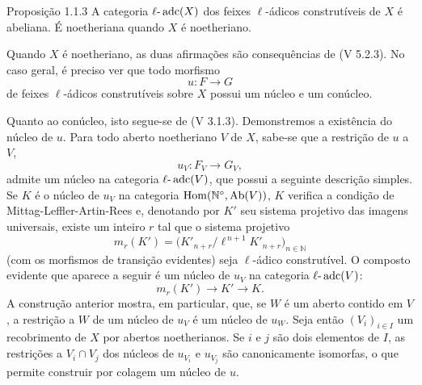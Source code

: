 \begin{statement}{Proposição 1.1.3}
A categoria \(\ell\text{-}\operatorname{adc}(X)\) dos feixes \(\ell\)-ádicos construtíveis de \(X\) é abeliana. É noetheriana quando \(X\) é noetheriano.
\end{statement}

\begin{prooftext}[Demonstração]
Quando \(X\) é noetheriano, as duas afirmações são consequências de (V 5.2.3). No caso geral, é preciso ver que todo morfismo
\[
u:F\longrightarrow G
\]
de feixes \(\ell\)-ádicos construtíveis sobre \(X\) possui um núcleo e um conúcleo.

Quanto ao conúcleo, isto segue-se de (V 3.1.3). Demonstremos a existência do núcleo de \(u\). Para todo aberto noetheriano \(V\) de \(X\), sabe-se que a restrição de \(u\) a \(V\),
\[
u_V:F_V\longrightarrow G_V,
\]
admite um núcleo na categoria \(\ell\text{-}\operatorname{adc}(V)\), que possui a seguinte descrição simples. Se \(K\) é o núcleo de \(u_V\) na categoria \(\operatorname{Hom}(\mathbb N^\circ,\operatorname{Ab}(V))\), \(K\) verifica a condição de Mittag-Leffler-Artin-Rees e, denotando por \(K'\) seu sistema projetivo das imagens universais, existe um inteiro \(r\) tal que o sistema projetivo
\[
m_r(K')=\bigl(K'_{n+r}/\ell^{\,n+1}K'_{n+r}\bigr)_{n\in\mathbb N}
\]
(com os morfismos de transição evidentes) seja \(\ell\)-ádico construtível. O composto evidente que aparece a seguir é um núcleo de \(u_V\) na categoria \(\ell\text{-}\operatorname{adc}(V)\):
\[
m_r(K')\longrightarrow K'\longrightarrow K.
\]
A construção anterior mostra, em particular, que, se \(W\) é um aberto contido em \(V\), a restrição a \(W\) de um núcleo de \(u_V\) é um núcleo de \(u_W\). Seja então \((V_i)_{i\in I}\) um recobrimento de \(X\) por abertos noetherianos. Se \(i\) e \(j\) são dois elementos de \(I\), as restrições a \(V_i\cap V_j\) dos núcleos de \(u_{V_i}\) e \(u_{V_j}\) são canonicamente isomorfas, o que permite construir por colagem um núcleo de \(u\).
\end{prooftext}
